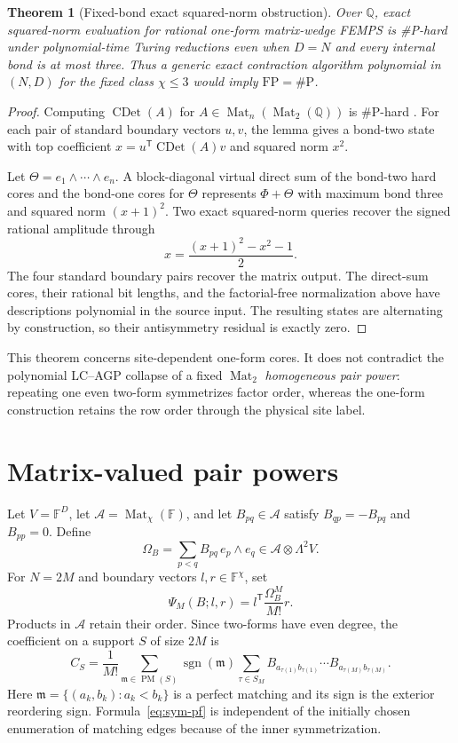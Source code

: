 \documentclass[11pt]{article}
\newtheorem{theorem}{Theorem}
\newcommand{\Mat}{\operatorname{Mat}}
\newcommand{\CayleyDet}{\operatorname{CDet}}
\begin{document}
\begin{theorem}[Fixed-bond exact squared-norm obstruction]
Over $\mathbb Q$, exact squared-norm evaluation for rational one-form
matrix-wedge FEMPS is \#P-hard under polynomial-time Turing reductions even
when $D=N$ and every internal bond is at most three.  Thus a generic exact
contraction algorithm polynomial in $(N,D)$ for the fixed class $\chi\le3$
would imply $\mathrm{FP}=\#\mathrm P$.
\end{theorem}

\begin{proof}
Computing $\CayleyDet(A)$ for
$A\in\Mat_n(\Mat_2(\mathbb Q))$ is \#P-hard
\cite{ChienEtAl2011}.  For each pair of standard boundary vectors $u,v$, the
lemma gives a bond-two state with top coefficient
$x=u^{\mathsf T}\CayleyDet(A)v$ and squared norm $x^2$.

Let $\Theta=e_1\wedge\cdots\wedge e_n$.  A block-diagonal virtual direct sum of
the bond-two hard cores and the bond-one cores for $\Theta$ represents
$\Phi+\Theta$ with maximum bond three and squared norm $(x+1)^2$.  Two exact
squared-norm queries recover the signed rational amplitude through
\[
  x=\frac{(x+1)^2-x^2-1}{2}.
\]
The four standard boundary pairs recover the matrix output.  The direct-sum
cores, their rational bit lengths, and the factorial-free normalization above
have descriptions polynomial in the source input.  The resulting states are
alternating by construction, so their antisymmetry residual is exactly zero.
\end{proof}

This theorem concerns site-dependent one-form cores.  It does not contradict
the polynomial LC--AGP collapse of a fixed $\Mat_2$ \emph{homogeneous pair
power}: repeating one even two-form symmetrizes factor order, whereas the
one-form construction retains the row order through the physical site label.

\section{Matrix-valued pair powers}

Let $V=\mathbb F^D$, let $\mathcal A=\Mat_\chi(\mathbb F)$, and let
$B_{pq}\in\mathcal A$ satisfy $B_{qp}=-B_{pq}$ and $B_{pp}=0$. Define
\[
  \Omega_B=\sum_{p<q}B_{pq}\,e_p\wedge e_q
  \in \mathcal A\otimes\Lambda^2V.
\]
For $N=2M$ and boundary vectors $l,r\in\mathbb F^\chi$, set
\[
  \Psi_M(B;l,r)=l^{\mathsf T}\frac{\Omega_B^M}{M!}r.
\]
Products in $\mathcal A$ retain their order. Since two-forms have even degree,
the coefficient on a support $S$ of size $2M$ is
\begin{equation}
  C_S=\frac1{M!}\sum_{\mathfrak m\in\operatorname{PM}(S)}
  \operatorname{sgn}(\mathfrak m)
  \sum_{\tau\in S_M}
  B_{a_{\tau(1)}b_{\tau(1)}}\cdots
  B_{a_{\tau(M)}b_{\tau(M)}}.
  \label{eq:sym-pf}
\end{equation}
Here $\mathfrak m=\{(a_k,b_k):a_k<b_k\}$ is a perfect matching and its sign
is the exterior reordering sign. Formula~\eqref{eq:sym-pf} is independent of
the initially chosen enumeration of matching edges because of the inner
symmetrization.
\end{document}

